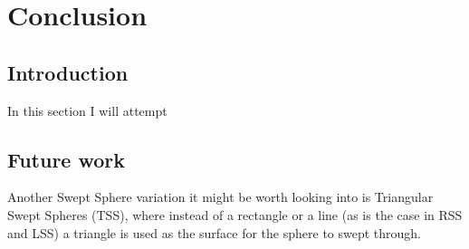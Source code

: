 
\section{Conclusion}
\label{conclusion}
\subsection{Introduction}
In this section I will attempt 


\subsection{Future work}
Another Swept Sphere variation it might be worth looking into is Triangular Swept Spheres (TSS), where instead of a rectangle or a line (as is the case in RSS and LSS) a triangle is used as the surface for the sphere to swept through.
